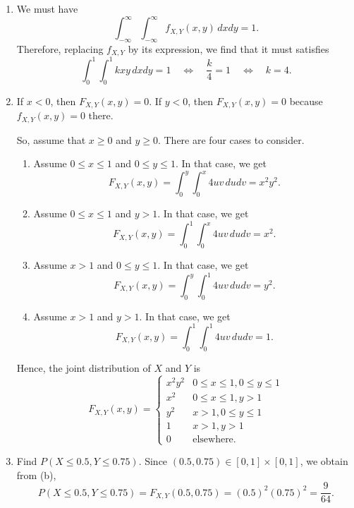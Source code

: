 \begin{problem}
\begin{enumerate}[label=\alph*)]
\item We must have
    \[
        \int_{-\infty}^\infty \int_{-\infty}^\infty f_{X, Y} (x, y) \, dx dy = 1 .
    \]
Therefore, replacing $f_{X, Y}$ by its expression, we find that it must satisfies
    \[
        \int_0^1 \int_0^1 k xy \, dx dy = 1 \quad \iff \quad \frac{k}{4} = 1 \quad \iff \quad k = 4 .
    \]
\item If $x < 0$, then $F_{X, Y} (x, y) = 0$. If $y < 0$, then $F_{X, Y} (x, y) = 0$ because $f_{X, Y} (x, y)= 0$ there. 

So, assume that $x \geq 0$ and $y \geq 0$. There are four cases to consider.
    \begin{enumerate}[label=\arabic*.]
        \item Assume $0 \leq x \leq 1$ and $0 \leq y \leq 1$. In that case, we get
            \[
                F_{X, Y} (x, y) = \int_0^y \int_0^x 4 uv \, du dv = x^2 y^2 .
            \]
        \item Assume $0 \leq x \leq 1$ and $y > 1$. In that case, we get
            \[
                F_{X, Y} (x, y) = \int_0^1 \int_0^x 4 uv \, du dv = x^2 .
            \]
        \item Assume $x > 1$ and $0 \leq y \leq 1$. In that case, we get
            \[
                F_{X, Y} (x, y) = \int_0^y \int_0^1 4uv \, du dv = y^2 .
            \]
        \item Assume $x > 1$ and $y > 1$. In that case, we get
            \[
                F_{X, Y} (x, y) = \int_0^1 \int_0^1 4uv \, du dv = 1 .
            \]
    \end{enumerate}
Hence, the joint distribution of $X$ and $Y$ is
    \[
        F_{X, Y} (x, y) = \left\lbrace \begin{matrix} x^2 y^2 & 0 \leq x \leq 1 , 0 \leq y \leq 1 \\ 
        x^2 & 0 \leq x \leq 1 , y > 1 \\ 
        y^2 & x > 1 , 0 \leq y \leq 1 \\ 
        1 & x > 1 , y > 1 \\ 
        0 & \text{elsewhere.} \end{matrix} \right. 
    \]
\item Find $P (X \leq 0.5 , Y \leq 0.75)$. Since $(0.5, 0.75) \in [0, 1] \times [0, 1]$, we obtain from (b),
    \[
        P (X \leq 0.5 , Y \leq 0.75) = F_{X, Y} (0. 5, 0.75) = (0.5)^2 (0.75)^2 = \frac{9}{64} . \tag*{$\square$}
    \]
\end{enumerate}
\end{problem}

